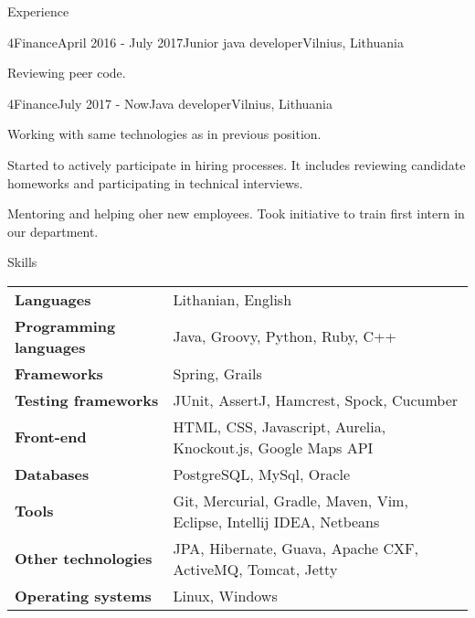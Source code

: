 \documentclass[]{resume} %
\begin{document}
\begin{rSection}{Experience}
\begin{rSubsection}{4Finance}{April 2016 - July 2017}{Junior java developer}{Vilnius, Lithuania}
        \item Reviewing peer code.

    \end{rSubsection}

    \begin{rSubsection}{4Finance}{July 2017 - Now}{Java developer}{Vilnius, Lithuania}
        \item Working with same technologies as in previous position.

        \item Started to actively participate in hiring processes. It includes
        reviewing candidate homeworks and participating in technical interviews.

        \item Mentoring and helping oher new employees. Took initiative to train first
        intern in our department.

    \end{rSubsection}

\end{rSection}


\begin{rSection}{Skills}

\begin{tabular}{ @{} >{\bfseries}l @{\hspace{6ex}} l }
Languages & Lithanian, English\\
Programming languages & Java, Groovy, Python, Ruby, C++  \\
Frameworks & Spring, Grails \\
Testing frameworks & JUnit, AssertJ, Hamcrest, Spock, Cucumber \\
Front-end & HTML, CSS, Javascript, Aurelia, Knockout.js, Google Maps API \\
Databases & PostgreSQL, MySql, Oracle \\
Tools & Git, Mercurial, Gradle, Maven, Vim, Eclipse, Intellij IDEA, Netbeans \\
Other technologies & JPA, Hibernate, Guava, Apache CXF, ActiveMQ, Tomcat, Jetty \\
Operating systems & Linux, Windows
\end{tabular}

\end{rSection}





\end{document}
